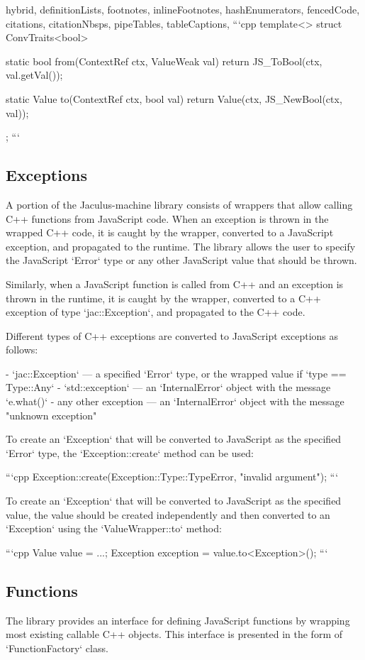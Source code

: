 \begin{markdown*}{%
  hybrid,
  definitionLists,
  footnotes,
  inlineFootnotes,
  hashEnumerators,
  fencedCode,
  citations,
  citationNbsps,
  pipeTables,
  tableCaptions,
}
```cpp
template<>
struct ConvTraits<bool> {
  static bool from(ContextRef ctx, ValueWeak val) {
    return JS_ToBool(ctx, val.getVal());
  }

  static Value to(ContextRef ctx, bool val) {
    return Value(ctx, JS_NewBool(ctx, val));
  }
};
```

\subsection{Exceptions}

A portion of the Jaculus-machine library consists of wrappers that allow calling C++ functions from JavaScript code. When an exception is thrown in the wrapped C++ code, it is caught by the wrapper, converted to a JavaScript exception, and propagated to the runtime. The library allows the user to specify the JavaScript `Error` type or any other JavaScript value that should be thrown.

Similarly, when a JavaScript function is called from C++ and an exception is thrown in the runtime, it is caught by the wrapper, converted to a C++ exception of type `jac::Exception`, and propagated to the C++ code.

Different types of C++ exceptions are converted to JavaScript exceptions as follows:

  - `jac::Exception` --- a specified `Error` type, or the wrapped value if `type == Type::Any`
  - `std::exception` --- an `InternalError` object with the message `e.what()`
  - any other exception --- an `InternalError` object with the message "unknown exception"

To create an `Exception` that will be converted to JavaScript as the specified `Error` type, the `Exception::create` method can be used:

```cpp
Exception::create(Exception::Type::TypeError, "invalid argument");
```

To create an `Exception` that will be converted to JavaScript as the specified value, the value should be created independently and then converted to an `Exception` using the `ValueWrapper::to` method:

```cpp
Value value = ...;
Exception exception = value.to<Exception>();
```

\subsection{Functions}

The library provides an interface for defining JavaScript functions by wrapping most existing callable C++ objects. This interface is presented in the form of `FunctionFactory` class.


\end{markdown*}
